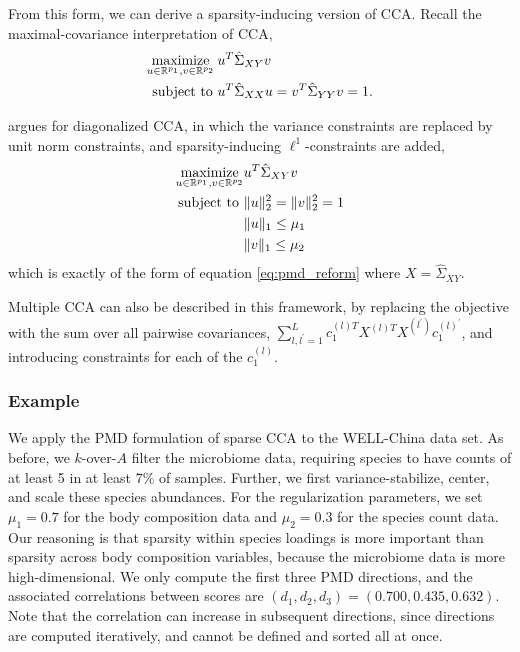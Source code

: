 \documentclass[14pt]{extarticle}
\begin{document}
From this form, we can derive a sparsity-inducing version of
CCA. Recall the maximal-covariance interpretation of CCA,
\begin{align*}
  \mathop\mathrm{maximize}_{u \in \mathbb{R}^{p_{1}}, v \in \mathbb{R}^{p_{2}}} \medspace &u^{T}\hat{\Sigma}_{XY}v \\
  \text{subject to } &u^{T}\hat{\Sigma}_{XX} u = v^{ T}\hat{\Sigma}_{YY}v = 1.
\end{align*}

\citep{witten2009penalized} argues for diagonalized CCA, in which the variance
constraints are replaced by unit norm constraints, and sparsity-inducing
$\ell^{1}$-constraints are added,
\begin{align*}
  \mathop\mathrm{maximize}_{u \in \mathbb{R}^{p_{1}}, v \in
    \mathbb{R}^{p_{2}}} & u^T\hat{\Sigma}_{XY}v  \\
  \text{subject to } &\|u\|_{2}^{2} = \|v\|_{2}^{2} = 1 \\
  &\|u\|_{1} \leq \mu_{1} \\
  &\|v\|_{1} \leq \mu_{2}
\end{align*}
which is exactly of the form of equation \ref{eq:pmd_reform} where $X =
\hat{\Sigma}_{XY}$.

Multiple CCA can also be described in this framework, by replacing the objective
with the sum over all pairwise covariances, $\sum_{l, l^{\prime} = 1}^{L}
c_{1}^{(l) T}X^{(l) T}X^{(l^{\prime})}c_{1}^{(l)^{\prime}}$, and introducing
constraints for each of the $c_{1}^{(l)}$.

\subsubsection{Example}
\label{subsec:sparse_cca_example}

We apply the PMD formulation of sparse CCA to the WELL-China data set. As
before, we $k$-over-$A$ filter the microbiome data, requiring species to have
counts of at least 5 in at least 7\% of samples. Further, we first
variance-stabilize, center, and scale these species abundances. For the
regularization parameters, we set $\mu_1 = 0.7$ for the body composition data
and $\mu_2 = 0.3$ for the species count data. Our reasoning is that sparsity
within species loadings is more important than sparsity across body composition
variables, because the microbiome data is more high-dimensional. We only compute
the first three PMD directions, and the associated correlations between scores
are $\left(d_1, d_2, d_3\right) = \left(0.700, 0.435, 0.632\right)$. Note that
the correlation can increase in subsequent directions, since directions are
computed iteratively, and cannot be defined and sorted all at once.
\end{document}
